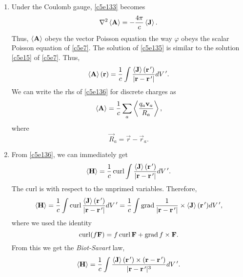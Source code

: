 \begin{enumerate}
\item Under the Coulomb gauge, \eqref{c5e133} becomes
\begin{equation}\label{c5e135}
\nabla^2\left\langle{\mathbf{A}}\right\rangle = -\frac{4\pi}{c}\left\langle{\mathbf{J}}\right\rangle.
\end{equation}
Thus, $\left\langle{\mathbf{A}}\right\rangle$ obeys the vector Poisson equation the way $\varphi$ obeys the
scalar Poisson equation of \eqref{c5e7}. The solution of \eqref{c5e135} is similar
to the solution \eqref{c5e15} of \eqref{c5e7}. Thus,
\begin{equation}\label{c5e136}
\left\langle{\mathbf{A}}\right\rangle(\mathbf{r}) = \frac{1}{c}\int\frac{\left\langle{\mathbf{J}}\right\rangle(\mathbf{r}^{\,\prime})}{|\mathbf{r} - \mathbf{r}^{\,\prime}|}dV^{\,\prime}.
\end{equation}
We can write the rhs of \eqref{c5e136} for discrete charges as
\begin{equation}\label{c5e137}
\left\langle{\mathbf{A}}\right\rangle = \frac{1}{c}\sum_a \left\langle{\frac{q_a\mathbf{v}_a}{R_a}}\right\rangle,
\end{equation}
where 
\begin{equation}\label{c5e138}
\vec{R}_a = \vec{r} - \vec{r}_a.
\end{equation}

\item From \eqref{c5e136}, we can immediately get
\[
\left\langle{\mathbf{H}}\right\rangle = \frac{1}{c}\operatorname{curl}\int\frac{\left\langle{\mathbf{J}}\right\rangle(\mathbf{r}^{\,\prime})}{|\mathbf{r} - \mathbf{r}^{\,\prime}|}dV^{\,\prime}.
\]
The curl is with respect to the unprimed variables. Therefore,
\[
\left\langle{\mathbf{H}}\right\rangle = \frac{1}{c}\int\operatorname{curl}\frac{\left\langle{\mathbf{J}}\right\rangle(\mathbf{r}^{\,\prime})}{|\mathbf{r} - \mathbf{r}^{\,\prime}|}dV^{\,\prime}
 = \frac{1}{c}\int\operatorname{grad}\frac{1}{|\mathbf{r} - \mathbf{r}^{\,\prime}|} \times \left\langle{\mathbf{J}}\right\rangle(\mathbf{r}^{\,\prime})dV^{\,\prime},
\]
where we used the identity
\begin{equation}\label{c5e139}
\operatorname{curl}(f\mathbf{F}) = f\operatorname{curl}\mathbf{F} + \operatorname{grad} f \times \mathbf{F}.
\end{equation}
From this we get the \emph{Biot-Savart} law,
\begin{equation}\label{c5e140}
\left\langle{\mathbf{H}}\right\rangle = \frac{1}{c}\int\frac{\left\langle{\mathbf{J}}\right\rangle(\mathbf{r}^{\,\prime}) \times (\mathbf{r} - \mathbf{r}^{\,\prime})}{|\mathbf{r} - \mathbf{r}^{\,\prime}|^3}dV^{\,\prime}.
\end{equation}

\end{enumerate}


